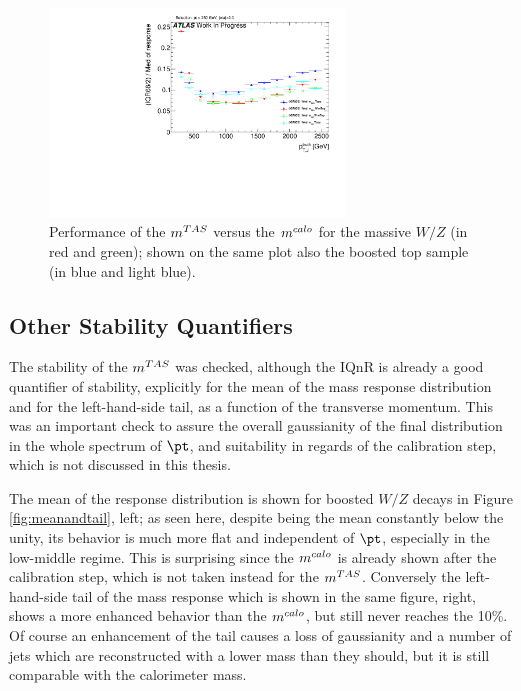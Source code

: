 \begin{figure}[!ht]
  \centering
     \includegraphics[width=0.7\textwidth]{jet_part/mtas/71graphcftr_h_JetRatio_mJ12CALOIQRoMcalib_WmassiveVsTops.pdf}
   \caption[$\mtas$ for boosted massive $W/Z$]{Performance of the $\mtas$ versus the $m^{calo}$ for the massive $W/Z$ (in red and green); shown on the same plot also the boosted top sample (in blue and light blue).}
  \label{fig:mtas6}
\end{figure}

\subsection{Other Stability Quantifiers}
The stability of the $\mtas$ was checked, although the IQnR is already a good quantifier of stability, explicitly for the mean of the mass response distribution and for the left-hand-side tail, as a function of the transverse momentum. This was an important check to assure the overall gaussianity of the final distribution in the whole spectrum of $\pt$, and suitability in regards of the calibration step, which is not discussed in this thesis.

The mean of the response distribution is shown for boosted $W/Z$ decays in Figure \ref{fig:meanandtail}, left; as seen here, despite being the mean constantly below the unity, its behavior is much more flat and independent of $\pt$, especially in the low-middle regime. This is surprising since the $m^{calo}$ is already shown after the calibration step, which is not taken instead for the $\mtas$. Conversely the left-hand-side tail of the mass response which is shown in the same figure, right, shows a more enhanced behavior than the $m^{calo}$, but still never reaches the 10\%. Of course an enhancement of the tail causes a loss of gaussianity and a number of jets which are reconstructed with a lower mass than they should, but it is still comparable with the calorimeter mass.

